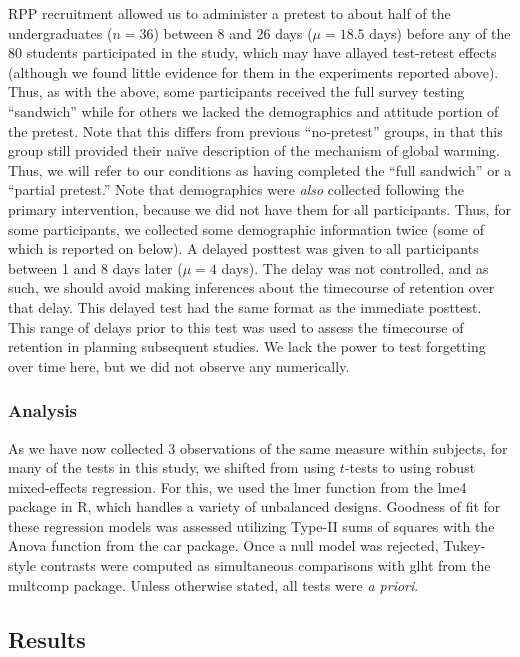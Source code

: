 RPP recruitment allowed us to administer a pretest to about half of the
undergraduates ($n=36$) between 8 and 26 days ($\mu=18.5$ days) before any of
the 80 students participated in the study, which may have allayed test-retest
effects (although we found little evidence for them in the experiments reported
above).  Thus, as with the above, some participants received the full survey
testing ``sandwich'' while for others we lacked the demographics and attitude
portion of the pretest. Note that this differs from previous “no-pretest”
groups, in that this group still provided their naïve description of the
mechanism of global warming. Thus, we will refer to our conditions as having
completed the  “full sandwich” or a “partial pretest.” Note that demographics
were \emph{also} collected following the primary intervention, because we did
not have them for all participants. Thus, for some participants, we collected
some demographic information twice (some of which is reported on below).
A delayed posttest was given to all participants between 1 and 8 days later
($\mu=4$ days). The delay was not controlled, and as such, we should avoid
making inferences about the timecourse of retention over that delay. This
delayed test had the same format as the immediate posttest.  This range of
delays prior to this test was used to assess the timecourse of retention in
planning subsequent studies. We lack the power to test forgetting over time
here, but we did not observe any numerically.

\subsubsection{Analysis}

As we have now collected 3 observations of the same measure within subjects, for
many of the tests in this study, we shifted from using $t$-tests to using robust
mixed-effects regression. For this, we used the \textsf{lmer} function from the
\textsf{lme4} package in R, which handles a variety of unbalanced designs.
Goodness of fit for these regression models was assessed utilizing Type-II
sums of squares with the \textsf{Anova} function from the \textsf{car} package.
Once a null model was rejected, Tukey-style contrasts were computed as
simultaneous comparisons with \textsf{glht} from the \textsf{multcomp} package.
Unless otherwise stated, all tests were \emph{a priori}.

\subsection{Results} 

